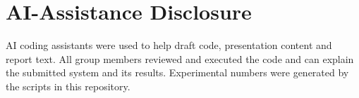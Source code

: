 \documentclass[11pt,a4paper]{article}
\begin{document}
\section{AI-Assistance Disclosure}
AI coding assistants were used to help draft code, presentation content and report text.
All group members reviewed and executed the code and can explain the submitted system and
its results. Experimental numbers were generated by the scripts in this repository.



\end{document}
